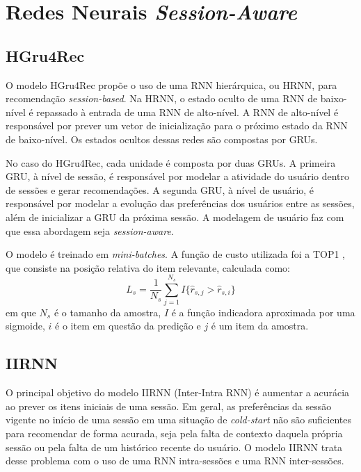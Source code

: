 \section{Redes Neurais \textit{Session-Aware}}

\subsection{HGru4Rec}

O modelo HGru4Rec propõe o uso de uma RNN hierárquica, ou HRNN, para
recomendação \textit{session-based}. Na HRNN, o estado oculto de uma RNN de
baixo-nível é repassado à entrada de uma RNN de alto-nível. A RNN de alto-nível
é responsável por prever um vetor de inicialização para o próximo estado da RNN
de baixo-nível. Os estados ocultos dessas redes são compostas por GRUs.

No caso do HGru4Rec, cada unidade é composta por duas GRUs. A primeira GRU, à
nível de sessão, é responsável por modelar a atividade do usuário dentro de
sessões e gerar recomendações. A segunda GRU, à nível de usuário, é responsável
por modelar a evolução das preferências dos usuários entre as sessões, além de
inicializar a GRU da próxima sessão. A modelagem de usuário faz com que essa abordagem
seja \textit{session-aware}.

O modelo é treinado em \textit{mini-batches}. A função de custo utilizada foi a
  TOP1 \cite{HidasiKBT15}, que consiste na posição relativa do item relevante,
  calculada como:
  \begin{equation}
    L_s = \frac{1}{N_s} \sum_{j=1}^{N_s}I\{ \hat{r}_{s,j} > \hat{r}_{s,i}\}
  \end{equation}
  em que $N_s$ é o tamanho da amostra, $I$ é a função indicadora aproximada por
  uma sigmoide, $i$ é o item em questão da predição e $j$ é um item da amostra.

\subsection{IIRNN}
  O principal objetivo do modelo IIRNN (Inter-Intra RNN) é aumentar a acurácia
ao prever os itens iniciais de uma sessão. Em geral, as preferências da sessão
vigente no início de uma sessão em uma situação de \textit{cold-start} não são
suficientes para recomendar de forma acurada, seja pela falta de contexto
daquela própria sessão ou pela falta de um histórico recente do usuário. O
modelo IIRNN trata desse problema com o uso de uma RNN intra-sessões e uma RNN
inter-sessões.

